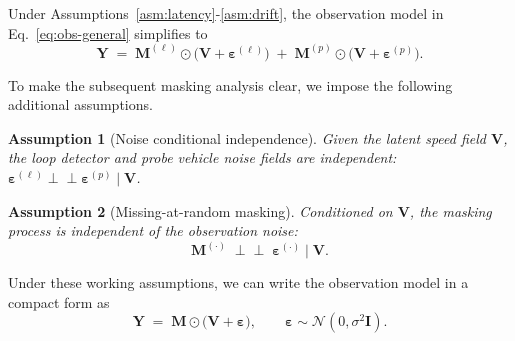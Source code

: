 \documentclass[a4paper,fleqn]{cas-sc}
\newtheorem{assumption}{Assumption}
\numberwithin{equation}{section}
\begin{document}
Under Assumptions~\ref{asm:latency}-\ref{asm:drift}, the observation model in Eq.~\eqref{eq:obs-general} simplifies to
\begin{equation}
    \mathbf Y \;=\;
    \mathbf M^{(\ell)}\odot\bigl(\mathbf V+\boldsymbol\varepsilon^{(\ell)}\bigr)
    \;+\;
    \mathbf M^{(p)}  \odot\bigl(\mathbf V+\boldsymbol\varepsilon^{(p)}\bigr).
    \label{eq:obs-simple}
\end{equation}

To make the subsequent masking analysis clear, we impose the following additional assumptions.
\begin{assumption}[Noise conditional independence]\label{asm:indep}
Given the latent speed field $\mathbf V$, the loop detector and probe vehicle noise fields are independent:
$\boldsymbol\varepsilon^{(\ell)} \perp\!\!\!\perp \boldsymbol\varepsilon^{(p)} \mid  \mathbf V$.
\end{assumption}
\begin{assumption}[Missing-at-random masking]\label{asm:mar}
Conditioned on $\mathbf V$, the masking process is independent of the observation noise:
\[
\mathbf M^{(\cdot)} \;\perp\!\!\!\perp\; \boldsymbol\varepsilon^{(\cdot)} \mid \mathbf V.
\]
\end{assumption}

Under these working assumptions, we can write the observation model in a compact form as
\begin{equation}
    \mathbf Y \;=\; \mathbf M \odot \bigl(\mathbf V + \boldsymbol\varepsilon\bigr), 
    \qquad \boldsymbol\varepsilon \sim\mathcal N(0,\sigma^{2}\mathbf I).
    \label{eq:obs-compact}
\end{equation}
\end{document}
